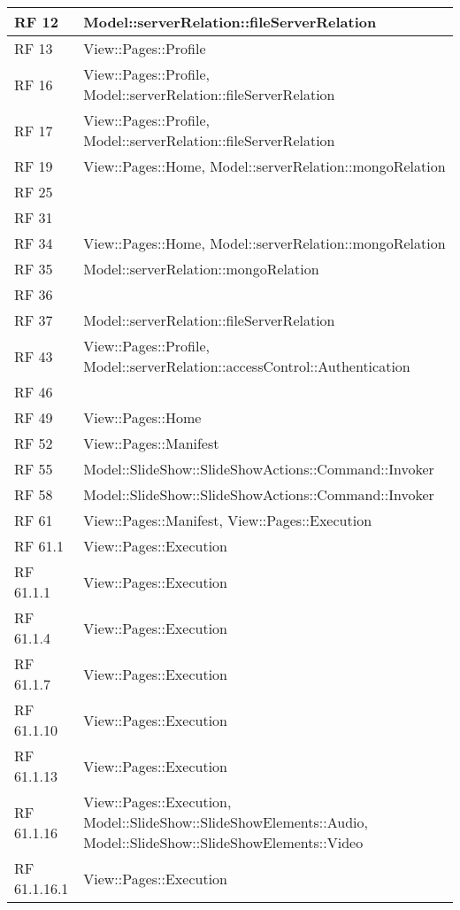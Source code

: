 {\begin{longtable} [c]{| p{2cm} | p{13cm} |}
 \hline 
RF 12 & Model::\-serverRelation::\-fileServerRelation\\ 
 \hline 
RF 13 & View::\-Pages::\-Profile\\ 
 \hline 
RF 16 & View::\-Pages::\-Profile, Model::\-serverRelation::\-fileServerRelation\\ 
 \hline 
RF 17 & View::\-Pages::\-Profile, Model::\-serverRelation::\-fileServerRelation\\ 
 \hline 
RF 19 & View::\-Pages::\-Home, Model::\-serverRelation::\-mongoRelation\\ 
 \hline 
RF 25 & \\ 
 \hline 
RF 31 & \\ 
 \hline 
RF 34 & View::\-Pages::\-Home, Model::\-serverRelation::\-mongoRelation\\ 
 \hline 
RF 35 & Model::\-serverRelation::\-mongoRelation\\ 
 \hline 
RF 36 & \\ 
 \hline 
RF 37 & Model::\-serverRelation::\-fileServerRelation\\ 
 \hline 
RF 43 & View::\-Pages::\-Profile, Model::\-serverRelation::\-accessControl::\-Authentication\\ 
 \hline 
RF 46 & \\ 
 \hline 
RF 49 & View::\-Pages::\-Home\\ 
 \hline 
RF 52 & View::\-Pages::\-Manifest\\ 
 \hline 
RF 55 & Model::\-SlideShow::\-SlideShowActions::\-Command::\-Invoker\\ 
 \hline 
RF 58 & Model::\-SlideShow::\-SlideShowActions::\-Command::\-Invoker\\ 
 \hline 
RF 61 & View::\-Pages::\-Manifest, View::\-Pages::\-Execution\\ 
 \hline 
RF 61.1 & View::\-Pages::\-Execution\\ 
 \hline 
RF 61.1.1 & View::\-Pages::\-Execution\\ 
 \hline 
RF 61.1.4 & View::\-Pages::\-Execution\\ 
 \hline 
RF 61.1.7 & View::\-Pages::\-Execution\\ 
 \hline 
RF 61.1.10 & View::\-Pages::\-Execution\\ 
 \hline 
RF 61.1.13 & View::\-Pages::\-Execution\\ 
 \hline 
RF 61.1.16 & View::\-Pages::\-Execution, Model::\-SlideShow::\-SlideShowElements::\-Audio, Model::\-SlideShow::\-SlideShowElements::\-Video\\ 
 \hline 
RF 61.1.16.1 & View::\-Pages::\-Execution\\ 

\end{longtable}}
